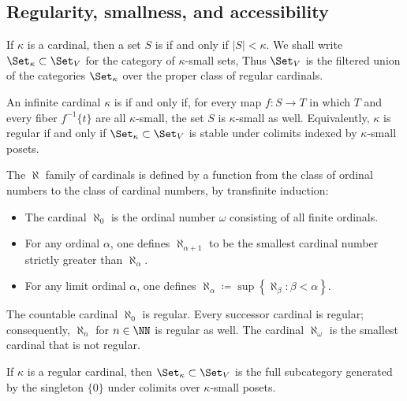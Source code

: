 \subsection{Regularity, smallness, and accessibility}%
\label{sub:regularity_smallness_and_accessibility}

\begin{definition}
	If $ \kappa $ is a cardinal,
	then a set $ S $ is 
	if and only if $ |S| < \kappa $.
	We shall write $ \Set_{\kappa} \subset \Set_V$
	for the category of $ \kappa $-small sets,
	Thus $ \Set_V $ is the filtered union of the categories $ \Set_{\kappa} $
	over the proper class of regular cardinals.
	
	An infinite cardinal $ \kappa $ is 
	if and only if, for every map $ f \colon S \to T $
	in which $ T $ and every fiber $ f^{-1}\{t\} $ are all $ \kappa $-small,
	the set $ S $ is $ \kappa $-small as well.
	Equivalently, $ \kappa $ is regular if and only if
	$ \Set_{\kappa} \subset \Set_V $ is stable under colimits indexed by $ \kappa $-small posets.
\end{definition}

\begin{eg}
	The $ \aleph $ family of cardinals is defined by
	a function from the class of ordinal numbers
	to the class of cardinal numbers, by transfinite induction:
	\begin{itemize}
		\item The cardinal $ \aleph_0 $ is the ordinal number
			$ \omega $ consisting of all finite ordinals.
		\item For any ordinal $ \alpha $,
			one defines $ \aleph_{\alpha + 1} $ to be
			the smallest cardinal number strictly greater than $ \aleph_{\alpha} $.
		\item For any limit ordinal $ \alpha $,
			one defines $ \aleph_{\alpha} \coloneq \sup \left\{ \aleph_{\beta} : \beta < \alpha \right\} $.
	\end{itemize}

	The countable cardinal $ \aleph_0 $ is regular.
	Every successor cardinal is regular;
	consequently, $ \aleph_n $ for $ n \in \NN $ is regular as well.
	The cardinal $ \aleph_{\omega} $ is the smallest cardinal that is not regular.
\end{eg}

\begin{nul}
	If $ \kappa $ is a regular cardinal,
	then $ \Set_{\kappa} \subset \Set_V $ is the full subcategory
	generated by the singleton $ \{ 0 \}$
	under colimits over $ \kappa $-small posets.
\end{nul}

